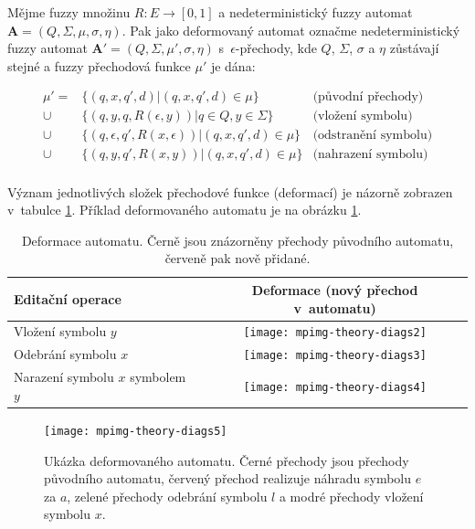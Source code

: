 \begin{definition} \label{def-AutRozpCalL}
 Mějme fuzzy množinu $R: E \rightarrow [0, 1]$ a nedeterministický fuzzy automat $\mathbf{A} = (Q, \Sigma, \mu, \sigma, \eta)$. Pak jako deformovaný automat označme nedeterministický fuzzy automat $\mathbf{A}' = (Q, \Sigma, \mu', \sigma, \eta)$ s~$\epsilon$-přechody, kde $Q$, $\Sigma$, $\sigma$ a $\eta$ zůstávají stejné a fuzzy přechodová funkce $\mu'$ je dána:
 
 \begin{align*}
  \mu' = 	& \{ (q, x, q', d) | (q, x, q', d) \in \mu \} 			& \text{(původní přechody)}	\\
    \cup 	& \{ (q, y, q, R(\epsilon, y)) | q \in Q, y \in \Sigma \} 	& \text{(vložení symbolu)}	\\
    \cup 	& \{ (q, \epsilon, q', R(x, \epsilon)) | (q, x, q', d) \in \mu \} & \text{(odstranění symbolu)}	\\
    \cup 	& \{ (q, y, q', R(x, y)) | (q, x, q', d) \in \mu \} 		& \text{(nahrazení symbolu)} \\
  \end{align*}
\end{definition}

Význam jednotlivých složek přechodové funkce (deformací) je názorně zobrazen v~tabulce \ref{tbl:DefAutDef}. Příklad deformovaného automatu je na obrázku \ref{img:DefAut}. 

\begin{table}
 \begin{tabular}{|l|c|}
  \hline
  Editační operace 			& Deformace (nový přechod v~automatu)	 \\
  \hline
  Vložení symbolu $y$ 			& \texttt{[image: mpimg-theory-diags2]} \\
  \hline
  Odebrání symbolu $x$ 			& \texttt{[image: mpimg-theory-diags3]} \\
  \hline
  Narazení symbolu $x$ symbolem $y$ 	& \texttt{[image: mpimg-theory-diags4]} \\
  \hline
 \end{tabular}
 \caption[Deformace automatu]{Deformace automatu. Černě jsou znázorněny přechody původního automatu, červeně pak nově přidané.} \label{tbl:DefAutDef}
\end{table}

\begin{figure}
  \texttt{[image: mpimg-theory-diags5]}
  \caption[Ukázka deformovaného automatu]{Ukázka deformovaného automatu. Černé přechody jsou přechody původního automatu, červený přechod realizuje náhradu symbolu $e$ za $a$, zelené přechody odebrání symbolu $l$ a modré přechody vložení symbolu $x$.} \label{img:DefAut}
\end{figure}
 
